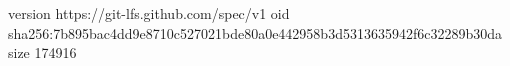 version https://git-lfs.github.com/spec/v1
oid sha256:7b895bac4dd9e8710c527021bde80a0e442958b3d5313635942f6c32289b30da
size 174916
